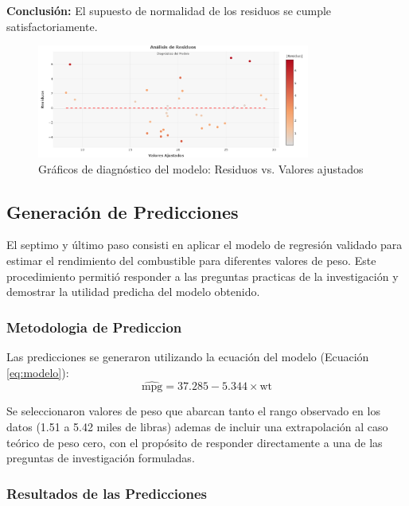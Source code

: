 \documentclass[12pt, letterpaper]{article}
\begin{document}
    \textbf{Conclusión:} El supuesto de normalidad de los residuos se cumple
    satisfactoriamente.

    \begin{figure}[H]
        \centering
        \includegraphics[width=0.8\textwidth]{Graficos/analisis de residuos.png}
        \caption{Gráficos de diagnóstico del modelo: Residuos vs. Valores ajustados}
        \label{fig:diagnostico}
    \end{figure}

 
    \subsection{Generación de Predicciones}

    El septimo y último paso consisti en aplicar el modelo de regresión  validado para estimar
    el rendimiento del combustible para diferentes valores de peso.
    Este procedimiento permitió responder a las preguntas practicas de la investigación y demostrar la utilidad predicha del modelo obtenido.    

    \subsubsection{Metodologia de Prediccion}

    Las predicciones se generaron utilizando la ecuación del modelo (Ecuación \ref{eq:modelo}):
    \begin{equation*}
        \widehat{\text{mpg}} = 37.285 - 5.344 \times \text{wt}
    \end{equation*}

    Se seleccionaron valores de peso que abarcan tanto el rango observado en los
    datos (1.51 a 5.42 miles de libras)  ademas de incluir una extrapolación al caso teórico de
    peso cero, con el propósito de responder directamente a una de las preguntas de investigación
    formuladas.

    \subsubsection{Resultados de las Predicciones}
\end{document}
